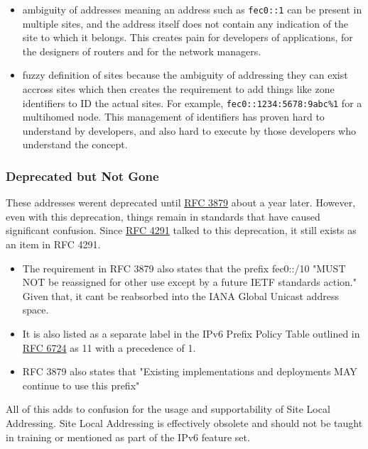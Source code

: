\documentclass[
]{article}
\providecommand{\tightlist}{%
  \setlength{\itemsep}{0pt}\setlength{\parskip}{0pt}}
\begin{document}
\begin{itemize}
\tightlist
\item
  ambiguity of addresses meaning an address such as \texttt{fec0::1} can
  be present in multiple sites, and the address itself does not contain
  any indication of the site to which it belongs. This creates pain for
  developers of applications, for the designers of routers and for the
  network managers.
\item
  fuzzy definition of sites because the ambiguity of addressing they can
  exist accross sites which then creates the requirement to add things
  like zone identifiers to ID the actual sites. For example,
  \texttt{fec0::1234:5678:9abc\%1} for a multihomed node. This
  management of identifiers has proven hard to understand by developers,
  and also hard to execute by those developers who understand the
  concept.
\end{itemize}

\subsubsection{Deprecated but Not Gone}\label{deprecated-but-not-gone}

These addresses weren\textquotesingle t deprecated until
\href{https://www.rfc-editor.org/rfc/rfc3879}{RFC 3879} about a year
later. However, even with this deprecation, things remain in standards
that have caused significant confusion. Since
\href{https://www.rfc-editor.org/rfc/rfc4291.html\#section-2.5.7}{RFC
4291} talked to this deprecation, it still exists as an item in RFC
4291.

\begin{itemize}
\tightlist
\item
  The requirement in RFC 3879 also states that the prefix fec0::/10
  "MUST NOT be reassigned for other use except by a future IETF
  standards action." Given that, it can\textquotesingle t be reabsorbed
  into the IANA Global Unicast address space.
\item
  It is also listed as a separate label in the IPv6 Prefix Policy Table
  outlined in \href{https://www.rfc-editor.org/rfc/rfc6724.html}{RFC
  6724} as 11 with a precedence of 1.
\item
  RFC 3879 also states that "Existing implementations and deployments
  MAY continue to use this prefix"
\end{itemize}

All of this adds to confusion for the usage and supportability of Site
Local Addressing. Site Local Addressing is effectively obsolete and
should not be taught in training or mentioned as part of the IPv6
feature set.
\end{document}
